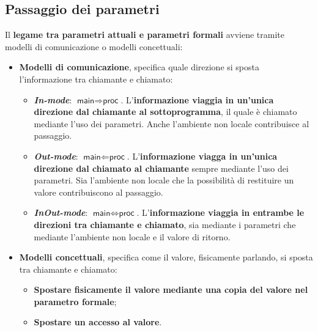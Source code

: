 \documentclass[a4paper]{article}
\begin{document}
	\subsection{Passaggio dei parametri}
	
	Il \textbf{legame tra parametri attuali e parametri formali} avviene tramite modelli di comunicazione o modelli concettuali:
	\begin{itemize}
		\item \textcolor{Red3}{\textbf{Modelli di comunicazione}}, specifica quale direzione si sposta l'informazione tra chiamante e chiamato:
		\begin{itemize}
			\item \textcolor{Red3}{\textbf{\emph{In-mode}}}: $\textsf{main} \Rightarrow \textsf{proc}$.\newline
			L'\textbf{informazione viaggia in un'unica direzione dal chiamante al sottoprogramma}, il quale è chiamato mediante l'uso dei parametri. Anche l'ambiente non locale contribuisce al passaggio.
			
			\item \textcolor{Red3}{\textbf{\emph{Out-mode}}}: $\textsf{main} \Leftarrow \textsf{proc}$.\newline
			L'\textbf{informazione viagga in un'unica direzione dal chiamato al chiamante} sempre mediante l'uso dei parametri. Sia l'ambiente non locale che la possibilità di restituire un valore contribuiscono al passaggio.
			
			\item \textcolor{Red3}{\textbf{\emph{InOut-mode}}}: $\textsf{main} \iff \textsf{proc}$.\newline
			L'\textbf{informazione viaggia in entrambe le direzioni tra chiamante e chiamato}, sia mediante i parametri che mediante l'ambiente non locale e il valore di ritorno.
		\end{itemize}
		
		\item \textcolor{Red3}{\textcolor{Red3}{\textbf{Modelli concettuali}}}, specifica come il valore, fisicamente parlando, si sposta tra chiamante e chiamato:
		\begin{itemize}
			\item \textbf{Spostare fisicamente il valore mediante una copia del valore nel parametro formale};
			
			\item \textbf{Spostare un accesso al valore}.
		\end{itemize}
	\end{itemize}
	
\end{document}

